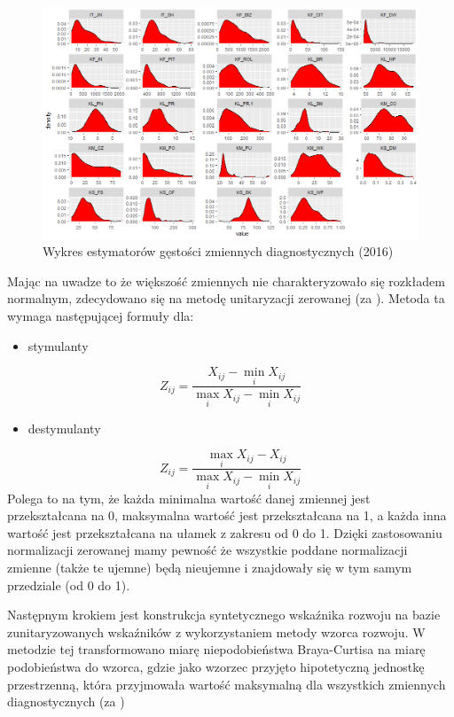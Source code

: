 \documentclass{amuthesis}
\begin{document}
\begin{figure}[t]

{\centering \includegraphics[width=1\linewidth]{figures/Gestosc_2016} 

}

\caption{Wykres estymatorów gęstości zmiennych diagnostycznych (2016)}\label{fig:rycina2}
\end{figure}

Mając na uwadze to że większość zmiennych nie charakteryzowało się rozkładem normalnym, zdecydowano się na metodę unitaryzacji zerowanej (za \textcite{churski_teoretyczny}).
Metoda ta wymaga następującej formuły dla:

\begin{itemize}
\tightlist
\item
  stymulanty
\end{itemize}

\[ 
Z_{ij} = \frac{X_{ij}-\min_{i}X_{ij}}{\max_{i}X_{ij}-\min_{i}X_{ij}}
\]

\begin{itemize}
\tightlist
\item
  destymulanty
\end{itemize}

\[ 
Z_{ij} = \frac{\max_{i}X_{ij}-X_{ij}}{\max_{i}X_{ij}-\min_{i}X_{ij}}
\]
Polega to na tym, że każda minimalna wartość danej zmiennej jest przekształcana na 0, maksymalna wartość jest przekształcana na 1, a każda inna wartość jest przekształcana na ułamek z zakresu od 0 do 1.
Dzięki zastosowaniu normalizacji zerowanej mamy pewność że wszystkie poddane normalizacji zmienne (także te ujemne) będą nieujemne i znajdowały się w tym samym przedziale (od 0 do 1).

Następnym krokiem jest konstrukcja syntetycznego wskaźnika rozwoju na bazie zunitaryzowanych wskaźników z wykorzystaniem metody wzorca rozwoju.
W metodzie tej transformowano miarę niepodobieństwa Braya-Curtisa na miarę podobieństwa do wzorca, gdzie jako wzorzec przyjęto hipotetyczną jednostkę przestrzenną, która przyjmowała wartość maksymalną dla wszystkich zmiennych diagnostycznych (za \textcite{perdal_zastosowanie})
\end{document}
